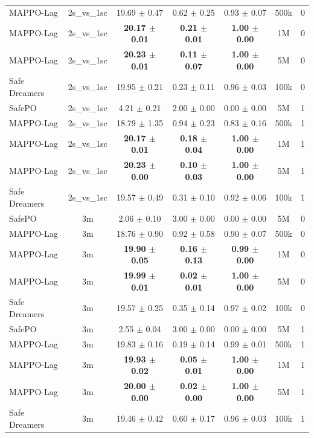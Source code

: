 \documentclass{article}
\begin{document}
\begin{longtable}{lcccccc}
MAPPO-Lag & 2s\_vs\_1sc & 19.69 $\pm$ 0.47 & 0.62 $\pm$ 0.25 & 0.93 $\pm$ 0.07 & 500k & 0 \\
MAPPO-Lag & 2s\_vs\_1sc & \textbf{20.17 $\pm$ 0.01} & \textbf{0.21 $\pm$ 0.01} & \textbf{1.00 $\pm$ 0.00} & 1M & 0 \\
MAPPO-Lag & 2s\_vs\_1sc & \textbf{20.23 $\pm$ 0.01} & \textbf{0.11 $\pm$ 0.07} & \textbf{1.00 $\pm$ 0.00} & 5M & 0 \\
Safe Dreamers & 2s\_vs\_1sc & 19.95 $\pm$ 0.21 & 0.23 $\pm$ 0.11 & 0.96 $\pm$ 0.03 & 100k & 0 \\
\midrule
SafePO & 2s\_vs\_1sc & 4.21 $\pm$ 0.21 & 2.00 $\pm$ 0.00 & 0.00 $\pm$ 0.00 & 5M & 1 \\
MAPPO-Lag & 2s\_vs\_1sc & 18.79 $\pm$ 1.35 & 0.94 $\pm$ 0.23 & 0.83 $\pm$ 0.16 & 500k & 1 \\
MAPPO-Lag & 2s\_vs\_1sc & \textbf{20.17 $\pm$ 0.01} & \textbf{0.18 $\pm$ 0.04} & \textbf{1.00 $\pm$ 0.00} & 1M & 1 \\
MAPPO-Lag & 2s\_vs\_1sc & \textbf{20.23 $\pm$ 0.00} & \textbf{0.10 $\pm$ 0.03} & \textbf{1.00 $\pm$ 0.00} & 5M & 1 \\
Safe Dreamers & 2s\_vs\_1sc & 19.57 $\pm$ 0.49 & 0.31 $\pm$ 0.10 & 0.92 $\pm$ 0.06 & 100k & 1 \\
\midrule
SafePO & 3m & 2.06 $\pm$ 0.10 & 3.00 $\pm$ 0.00 & 0.00 $\pm$ 0.00 & 5M & 0 \\
MAPPO-Lag & 3m & 18.76 $\pm$ 0.90 & 0.92 $\pm$ 0.58 & 0.90 $\pm$ 0.07 & 500k & 0 \\
MAPPO-Lag & 3m & \textbf{19.90 $\pm$ 0.05} & \textbf{0.16 $\pm$ 0.13} & \textbf{0.99 $\pm$ 0.00} & 1M & 0 \\
MAPPO-Lag & 3m & \textbf{19.99 $\pm$ 0.01} & \textbf{0.02 $\pm$ 0.01} & \textbf{1.00 $\pm$ 0.00} & 5M & 0 \\
Safe Dreamers & 3m & 19.57 $\pm$ 0.25 & 0.35 $\pm$ 0.14 & 0.97 $\pm$ 0.02 & 100k & 0 \\
\midrule
SafePO & 3m & 2.55 $\pm$ 0.04 & 3.00 $\pm$ 0.00 & 0.00 $\pm$ 0.00 & 5M & 1 \\
MAPPO-Lag & 3m & 19.83 $\pm$ 0.16 & 0.19 $\pm$ 0.14 & 0.99 $\pm$ 0.01 & 500k & 1 \\
MAPPO-Lag & 3m & \textbf{19.93 $\pm$ 0.02} & \textbf{0.05 $\pm$ 0.01} & \textbf{1.00 $\pm$ 0.00} & 1M & 1 \\
MAPPO-Lag & 3m & \textbf{20.00 $\pm$ 0.00} & \textbf{0.02 $\pm$ 0.00} & \textbf{1.00 $\pm$ 0.00} & 5M & 1 \\
Safe Dreamers & 3m & 19.46 $\pm$ 0.42 & 0.60 $\pm$ 0.17 & 0.96 $\pm$ 0.03 & 100k & 1 \\

\end{longtable}
\end{document}
